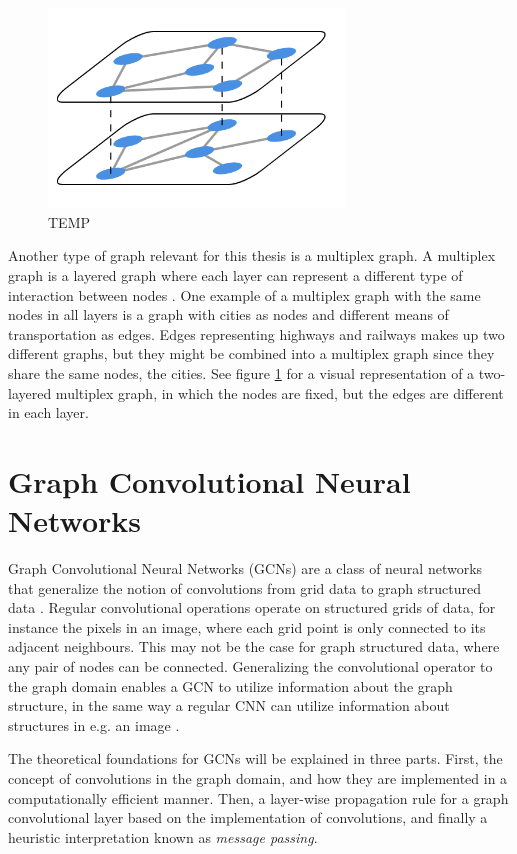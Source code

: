 \begin{figure}[H]
    \centering
    \includegraphics[width=0.7\textwidth]{chapters/images_theory/multiplex.png}
    \caption{TEMP}
    \label{fig:multiplex_graph}
\end{figure}
Another type of graph relevant for this thesis is a multiplex graph. A multiplex graph is a layered graph where each layer can represent a different type of interaction between nodes \cite{multiplex_book_chap2}. One example of a multiplex graph with the same nodes in all layers is a graph with cities as nodes and different means of transportation as edges. Edges representing highways and railways makes up two different graphs, but they might be combined into a multiplex graph since they share the same nodes, the cities. See figure \ref{fig:multiplex_graph} for a visual representation of a two-layered multiplex graph, in which the nodes are fixed, but the edges are different in each layer.


\section{Graph Convolutional Neural Networks}
\label{sec:gcn}

Graph Convolutional Neural Networks (GCNs) are a class of neural networks that generalize the notion of convolutions from grid data to graph structured data \cite{wu_review}. Regular convolutional operations operate on structured grids of data, for instance the pixels in an image, where each grid point is only connected to its adjacent neighbours. This may not be the case for graph structured data, where any pair of nodes can be connected. Generalizing the convolutional operator to the graph domain enables a GCN to utilize information about the graph structure, in the same way a regular CNN can utilize information about structures in e.g. an image \cite{wu_review}.

The theoretical foundations for GCNs will be explained in three parts. First, the concept of convolutions in the graph domain, and how they are implemented in a computationally efficient manner. Then, a layer-wise propagation rule for a graph convolutional layer based on the implementation of convolutions, and finally a heuristic interpretation known as \textit{message passing}.

